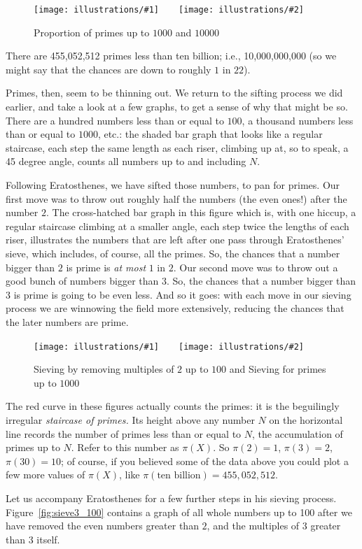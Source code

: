\documentclass[11pt,draft]{article}
\newcommand{\illtwo}[4]{ 
   \begin{figure}[H]
   \begin{center}
   \texttt{[image: illustrations/\#1]}$\qquad$\texttt{[image: illustrations/\#2]}
   \caption{#4}
    \end{center}
    \end{figure}
}
\theoremstyle{plain}
\theoremstyle{definition}
\numberwithin{equation}{section}
\numberwithin{figure}{section}
\numberwithin{table}{section}
\begin{document}
\illtwo{proportion_primes_1000}{proportion_primes_10000}{0.4}{Proportion of primes up to $1000$ and $10000$}

There are 455,052,512 primes less than ten billion; i.e.,
10,000,000,000 (so we might say that the chances are down to roughly
$1$ in $22$).

Primes, then, seem to be thinning out.  We return to the sifting process
we did earlier, and take a look at a few graphs, to get a sense of why
that might be so. There are a hundred numbers less than or equal to
$100$, a thousand numbers less than or equal to $1000$, etc.: the
shaded bar graph that looks like a regular staircase, each step the
same length as each riser, climbing up at, so to speak, a 45 degree
angle, counts all numbers up to and including $N$.

Following Eratosthenes, we have sifted those numbers, to pan for
primes. Our first move was to throw out roughly half the numbers (the
even ones!) after the number $2$. The cross-hatched bar graph in this
figure which is, with one hiccup, a regular staircase climbing at a
smaller angle, each step twice the lengths of each riser, illustrates
the numbers that are left after one pass through Eratosthenes' sieve,
which includes, of course, all the primes. So, the chances that a
number bigger than $2$ is prime is {\em at most} $1$ in $2$.  Our
second move was to throw out a good bunch of numbers bigger than $3$.
So, the chances that a number bigger than $3$ is prime is going to be
even less.  And so it goes: with each move in our
sieving process we are winnowing the field more extensively, reducing
the chances that the later numbers are prime.

\illtwo{sieve_2_200}{sieve1000}{.45}{Sieving by removing multiples of $2$ up to $100$ and Sieving for primes up to $1000$}
          
The red curve in these figures actually counts the primes: it is the
beguilingly irregular {\em staircase of primes.}  Its height above any
number $N$ on the horizontal line records the number of primes less
than or equal to $N$, the accumulation of primes up to $N$.  Refer to
this number as $\pi(X)$. So $\pi(2)=1$, $\pi(3) = 2$, $\pi(30) = 10$; of
course, if you believed some of the data above you could plot a few
more values of $\pi(X)$, like $\pi(\text{ten billion}) = 455,052,512$.
                              
                                 
Let us accompany Eratosthenes for a few further steps in his sieving
process.  Figure~\ref{fig:sieve3_100} contains a graph of all whole
numbers up to 100 after we have removed the even numbers greater than
$2$, and the multiples of $3$ greater than $3$ itself.
                                 
\end{document}
